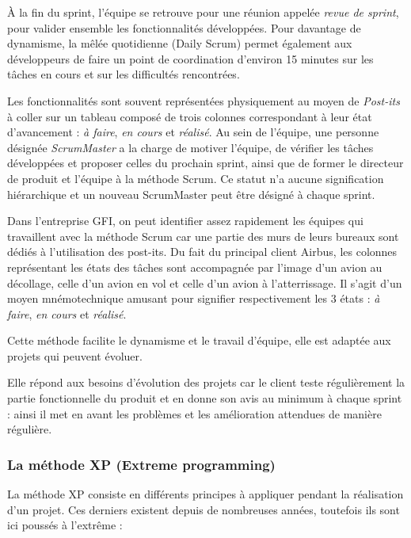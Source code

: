 À la fin du sprint, l'équipe se retrouve pour une réunion appelée \textit{revue de sprint}, pour valider ensemble les fonctionnalités développées.
Pour davantage de dynamisme, la mêlée quotidienne (Daily Scrum) permet également aux développeurs de faire un point de coordination d'environ 15 minutes sur les tâches en cours et sur les difficultés rencontrées.

Les fonctionnalités sont souvent représentées physiquement au moyen de \textit{Post-its} à coller sur un tableau composé de trois colonnes correspondant à leur état d'avancement : \textit{à faire}, \textit{en cours} et \textit{réalisé}. Au sein de l'équipe, une personne désignée \textit{ScrumMaster} a la charge de motiver l'équipe, de vérifier les tâches développées et proposer celles du prochain sprint, ainsi que de former le directeur de produit et l'équipe à la méthode Scrum. Ce statut n'a aucune signification hiérarchique et un nouveau ScrumMaster peut être désigné à chaque sprint.

\begin{app}
Dans l'entreprise GFI, on peut identifier assez rapidement les équipes qui travaillent avec la méthode Scrum car une partie des murs de leurs bureaux sont dédiés à l'utilisation des post-its. Du fait du principal client Airbus, les colonnes représentant les états des tâches sont accompagnée par l'image d'un avion au décollage, celle d'un avion en vol et celle d'un avion à l'atterrissage. Il s'agit d'un moyen mnémotechnique amusant pour signifier respectivement les 3 états : \textit{à faire}, \textit{en cours} et \textit{réalisé}.
\end{app}

Cette méthode facilite le dynamisme et le travail d'équipe, elle est adaptée aux projets qui peuvent évoluer.

Elle répond aux besoins d'évolution des projets car le client teste régulièrement la partie fonctionnelle du produit et en donne son avis au minimum à chaque sprint : ainsi il met en avant les problèmes et les amélioration attendues de manière régulière.

\subsubsection{La méthode XP (Extreme programming)}

La méthode XP consiste en différents principes à appliquer pendant la réalisation d'un projet. Ces derniers existent depuis de nombreuses années, toutefois ils sont ici poussés à l'extrême :

